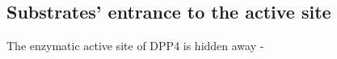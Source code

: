 \subsection{Substrates' entrance to the active site}

The enzymatic active site of DPP4 is hidden away \beta-